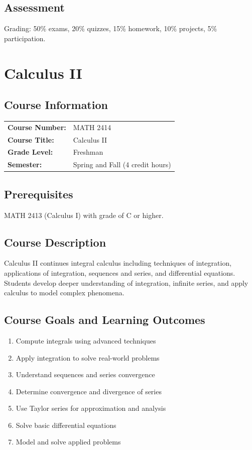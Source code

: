 \documentclass[12pt,oneside]{book}
\begin{document}
\section{Assessment}

Grading: 50\% exams, 20\% quizzes, 15\% homework, 10\% projects, 5\% participation.


\chapter{Calculus II}

\section{Course Information}

\begin{tabular}{ll}
\textbf{Course Number:} & MATH 2414 \\
\textbf{Course Title:} & Calculus II \\
\textbf{Grade Level:} & Freshman \\
\textbf{Semester:} & Spring and Fall (4 credit hours) \\
\end{tabular}

\section{Prerequisites}

MATH 2413 (Calculus I) with grade of C or higher.

\section{Course Description}

Calculus II continues integral calculus including techniques of integration, applications of integration, sequences and series, and differential equations. Students develop deeper understanding of integration, infinite series, and apply calculus to model complex phenomena.

\section{Course Goals and Learning Outcomes}

\begin{enumerate}
    \item Compute integrals using advanced techniques
    \item Apply integration to solve real-world problems
    \item Understand sequences and series convergence
    \item Determine convergence and divergence of series
    \item Use Taylor series for approximation and analysis
    \item Solve basic differential equations
    \item Model and solve applied problems
\end{enumerate}
\end{document}
